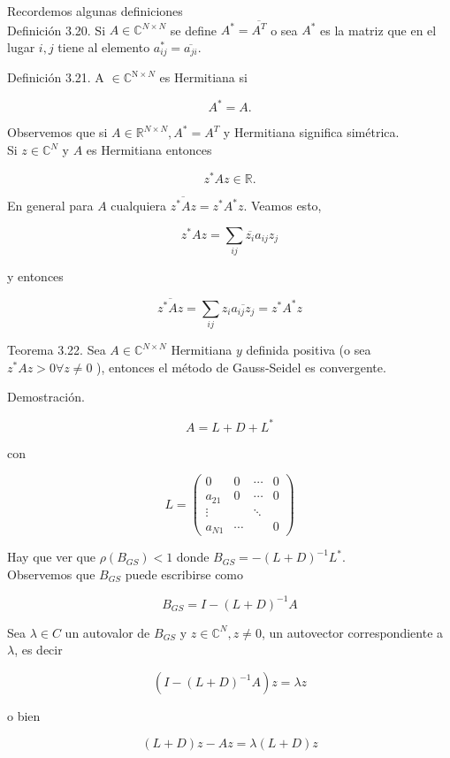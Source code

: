 \documentclass[10pt]{article}
\begin{document}
Recordemos algunas definiciones\\
Definición 3.20. Si $A \in \mathbb{C}^{N \times N}$ se define $A^{*}=\overline{A^{T}}$ o sea $A^{*}$ es la matriz que en el lugar $i, j$ tiene al elemento $a_{i j}^{*}=\overline{a_{j i}}$.

Definición 3.21. A $\in \mathbb{C}^{\mathrm{N} \times N}$ es Hermitiana si

$$
A^{*}=A .
$$

Observemos que si $A \in \mathbb{R}^{N \times N}, A^{*}=A^{T}$ y Hermitiana significa simétrica.\\
Si $z \in \mathbb{C}^{N}$ y $A$ es Hermitiana entonces

$$
z^{*} A z \in \mathbb{R} .
$$

En general para $A$ cualquiera $\overline{z^{*} A z}=z^{*} A^{*} z$. Veamos esto,

$$
z^{*} A z=\sum_{i j} \overline{z_{i}} a_{i j} z_{j}
$$

y entonces

$$
\overline{z^{*} A z}=\sum_{i j} z_{i} \overline{a_{i j} z_{j}}=z^{*} A^{*} z
$$

Teorema 3.22. Sea $A \in \mathbb{C}^{N \times N}$ Hermitiana $y$ definida positiva (o sea $z^{*} A z>0 \forall z \neq 0$ ), entonces el método de Gauss-Seidel es convergente.

Demostración.

$$
A=L+D+L^{*}
$$

con

$$
L=\left(\begin{array}{cccc}
0 & 0 & \cdots & 0 \\
a_{21} & 0 & \cdots & 0 \\
\vdots & & \ddots & \\
a_{N 1} & \cdots & & 0
\end{array}\right)
$$

Hay que ver que $\rho\left(B_{G S}\right)<1$ donde $B_{G S}=-(L+D)^{-1} L^{*}$.\\
Observemos que $B_{G S}$ puede escribirse como

$$
B_{G S}=I-(L+D)^{-1} A
$$

Sea $\lambda \in C$ un autovalor de $B_{G S}$ y $z \in \mathbb{C}^{N}, z \neq 0$, un autovector correspondiente a $\lambda$, es decir

$$
\left(I-(L+D)^{-1} A\right) z=\lambda z
$$

o bien

$$
(L+D) z-A z=\lambda(L+D) z
$$
\end{document}
